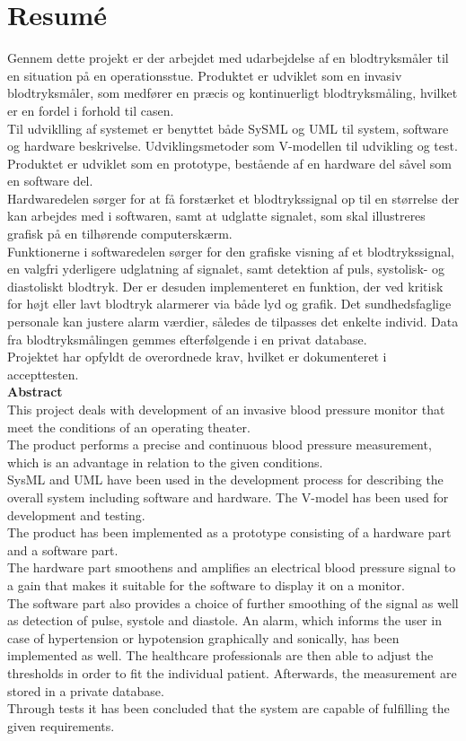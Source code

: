 \chapter{Resumé}
Gennem dette projekt er der arbejdet med udarbejdelse af en blodtryksmåler til en situation på en operationsstue. Produktet er udviklet som en invasiv blodtryksmåler, som medfører en præcis og kontinuerligt blodtryksmåling, hvilket er en fordel i forhold til casen. \\
Til udviklling af systemet er benyttet både SySML og UML til system, software og hardware beskrivelse. Udviklingsmetoder som V-modellen til udvikling og test.\\ 
Produktet er udviklet som en prototype, bestående af en hardware del såvel som en software del.\\[0.5ex]
Hardwaredelen sørger for at få forstærket et blodtrykssignal op til en størrelse der kan arbejdes med i softwaren, samt at udglatte signalet, som skal illustreres grafisk på en tilhørende computerskærm.\\[1ex]
Funktionerne i softwaredelen sørger for den grafiske visning af et blodtrykssignal, en valgfri yderligere udglatning af signalet, samt detektion af puls, systolisk- og diastoliskt blodtryk. Der er desuden implementeret en funktion, der ved kritisk for højt eller lavt blodtryk alarmerer via både lyd og grafik. Det sundhedsfaglige personale kan justere alarm værdier, således de tilpasses det enkelte individ. Data fra blodtryksmålingen gemmes efterfølgende i en privat database.\\[0.5ex]
Projektet har opfyldt de overordnede krav, hvilket er dokumenteret i accepttesten. \\[2ex]
\textbf{Abstract}\\
This project deals with development of an invasive blood pressure monitor that meet the conditions of an operating theater.\\
The product performs a precise and continuous blood pressure measurement, which is an advantage in relation to the given conditions.\\
SysML and UML have been used in the development process for describing the overall system including software and hardware. The V-model has been used for development and testing.\\
The product has been implemented as a prototype consisting of a hardware part and a software part.\\
The hardware part smoothens and amplifies an electrical blood pressure signal to a gain that makes it suitable for the software to display it on a monitor.\\
The software part also provides a choice of further smoothing of the signal as well as detection of pulse, systole and diastole. An alarm, which informs the user in case of hypertension or hypotension graphically and sonically, has been implemented as well. The healthcare professionals are then able to adjust the thresholds in order to fit the individual patient. Afterwards, the measurement are stored in a private database.\\
Through tests it has been concluded that the system are capable of fulfilling the given requirements.
